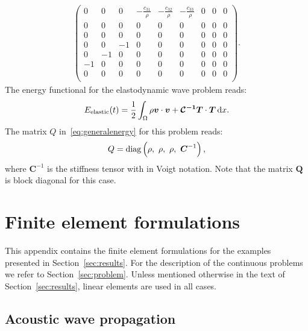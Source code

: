 \documentclass[a4paper]{article}
\renewcommand{\vec}{\boldsymbol}
\begin{document}
\begin{multline}
\begin{pmatrix}
    0 & 0 & 0 & -\frac{c_{31}}{\rho} & -\frac{c_{32}}{\rho} &
    -\frac{c_{33}}{\rho}
    & 0 & 0 & 0 \\
    0 & 0 & 0 & 0 & 0 & 0 & 0 & 0 & 0 \\
    0 & 0 & 0 & 0 & 0 & 0 & 0 & 0 & 0 \\
    0 & 0 & -1 & 0 & 0 & 0 & 0 & 0 & 0 \\
    0 & -1 & 0 & 0 & 0 & 0 & 0 & 0 & 0 \\
    -1 & 0 & 0 & 0 & 0 & 0 & 0 & 0 & 0 \\
    0 & 0 & 0 & 0 & 0 & 0 & 0 & 0 & 0 \\
  \end{pmatrix}.
  \label{eq:Aelasto}
\end{multline}
The energy functional for the elastodynamic wave problem reads:
\begin{equation}
  E_\text{elastic}(t)
  = \frac{1}{2}\int_{\Omega} \rho \vec{v} \cdot
  \vec{v} + \vec{\mathcal{C}^{-1}} \vec{T} \cdot \vec{T} \dif x.
\label{eq:elastodynamicenergy}
\end{equation}
The matrix $Q$ in~\eqref{eq:generalenergy} for this problem reads:
\begin{equation}
  Q = \text{diag}\del{\rho, \ \rho, \ \rho, \ \vec{C}^{-1}},
\label{eq:Qelasto}
\end{equation}
where $\vec{C}^{-1}$ is the stiffness tensor with in Voigt notation.
Note that the matrix $\vec{Q}$ is block diagonal for this case.

\section{Finite element formulations}
\label{sec:fem}

This appendix contains the finite element formulations for the
examples presented in Section~\ref{sec:results}. For the description
of the continuous problems we refer to
Section~\ref{sec:problem}. Unless mentioned otherwise in the text of
Section~\ref{sec:results}, linear elements are used in all cases.

\subsection{Acoustic wave propagation}
\label{sec:acdiscr}
\end{document}
